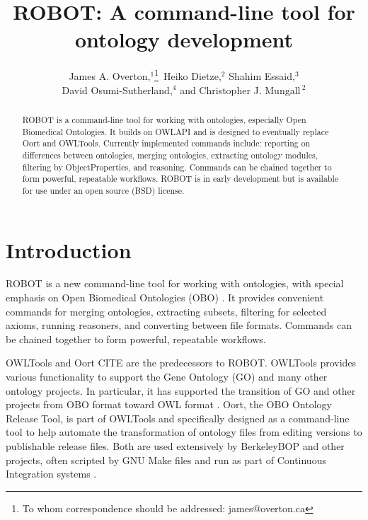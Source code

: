 \documentclass{icbo}
\begin{document}
\title[ROBOT]{ROBOT: A command-line tool for ontology development}
\author[Overton \textit{et~al}]{
James A. Overton,$^{1}$\footnote{To whom correspondence should be addressed: james@overton.ca}\,
Heiko Dietze,$^{2}$
Shahim Essaid,$^{3}$\\
David Osumi-Sutherland,$^{4}$
and Christopher J. Mungall\,$^{2}$}
\address{$^{1}$Knocean, Toronto, Ontario, Canada\\
$^{2}$Lawrence Berkeley National Laboratory, Berkeley, California, USA\\
$^{3}$Oregon Health and Science University Library, Portland, Oregon, USA\\
$^{4}$European Bioinformatics Institute, TODO LOCATION}

\maketitle

\begin{abstract}
ROBOT is a command-line tool for working with ontologies, especially Open Biomedical Ontologies. It builds on OWLAPI and is designed to eventually replace Oort and OWLTools. Currently implemented commands include: reporting on differences between ontologies, merging ontologies, extracting ontology modules, filtering by ObjectProperties, and reasoning. Commands can be chained together to form powerful, repeatable workflows. ROBOT is in early development but is available for use under an open source (BSD) license.
\end{abstract}

\section{Introduction}

ROBOT is a new command-line tool for working with ontologies, with special emphasis on Open Biomedical Ontologies (OBO) \citep{Smith2007}. It provides convenient commands for merging ontologies, extracting subsets, filtering for selected axioms, running reasoners, and converting between file formats. Commands can be chained together to form powerful, repeatable workflows.

OWLTools and Oort CITE are the predecessors to ROBOT. OWLTools provides various functionality to support the Gene Ontology (GO) and many other ontology projects. In particular, it has supported the transition of GO and other projects from OBO format toward OWL format \citep{Mungall2014}. Oort, the OBO Ontology Release Tool, is part of OWLTools and specifically designed as a command-line tool to help automate the transformation of ontology files from editing versions to publishable release files. Both are used extensively by BerkeleyBOP and other projects, often scripted by GNU Make files and run as part of Continuous Integration systems \citep{Mungall2012}.
\end{document}
